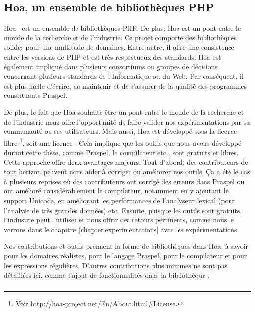 \subsection{Hoa, un ensemble de bibliothèques PHP}
\label{subsection:tools:hoa}

Hoa~ est un ensemble de bibliothèques PHP. De plus, Hoa est un pont
entre le monde de la recherche et de l'industrie. Ce projet comporte des
bibliothèques solides pour une multitude de domaines. Entre autre, il offre une
consistence entre les versions de PHP et est très respectueux des standards. Hoa
est également impliqué dans plusieurs consortiums ou groupes de décisions
concernant plusieurs standards de l'Informatique ou du Web. Par conséquent, il
est plus facile d'écrire, de maintenir et de s'assurer de la qualité des
programmes constituants Praspel.

De plus, le fait que Hoa souhaite être un pont entre le monde de la recherche et
de l'industrie nous offre l'opportunité de faire valider nos expérimentations
par sa communauté ou ses utilisateurs. Mais aussi, Hoa est développé sous la
licence libre \footnote{Voir
\url{http://hoa-project.net/En/About.html\#License}.}, soit une licence
. Cela implique que les outils que nous avons développé
durant cette thèse, comme Praspel, le compilateur etc., sont gratuits et libres.
Cette approche offre deux avantages majeurs. Tout d'abord, des contributeurs de
tout horizon peuvent nous aider à corriger ou améliorer nos outils. Ça a été le
cas à plusieurs reprises où des contributeurs ont corrigé des erreurs dans
Praspel ou ont amélioré considérablement le compilateur, notamment en y ajoutant
le support Unicode, en améliorant les performances de l'analyseur lexical (pour
l'analyse de très grandes données) etc. Ensuite, puisque les outils sont
gratuits, l'industrie peut l'utiliser et nous offrir des retours pertinents,
comme nous le verrons dans le chapitre~\ref{chapter:experimentations} avec les
expérimentations.

Nos contributions et outils prennent la forme de bibliothèques dans Hoa, à
savoir  pour les domaines réalistes,
 pour le langage Praspel, 
pour le compilateur et  pour les expressions régulières.
D'autres contributions plus minimes ne sont pas détaillées ici, comme l'ajout de
fonctionnalités dans la bibliothèque .

\subsubsection{}

